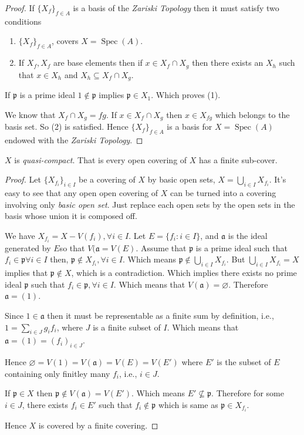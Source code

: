 \documentclass[]{report}
\DeclareMathOperator\Spec{Spec}
\begin{document}
\begin{proof}
    If $\{X_f\}_{f \in A}$ is a basis of the \textit{Zariski Topology} then it must satisfy two conditions
    \begin{enumerate}
        \item $\{X_f\}_{f \in A}$, covers $X = \Spec(A)$.
        \item If $X_f, X_f$ are base elements then if $x \in X_f \cap X_g$ then there exists an $X_h$ such that $x \in X_h$ and $X_h \subseteq X_f \cap X_g$.     \end{enumerate}

    If $\mathfrak{p}$ is a prime ideal $1 \not \in \mathfrak{p}$  implies $\mathfrak{p} \in X_1$. Which proves (1).

    We know that $X_f \cap X_g = fg$. If $x \in X_f \cap X_g$ then $x \in X_{fg}$ which belongs to the basis set. So (2) is satisfied. Hence $\{X_f\}_{f \in A}$ is a basis for $X = \Spec(A)$ endowed with the \textit{Zariski Topology}.

\end{proof}

$X$ is \textit{quasi-compact}. That is every open covering of $X$ has a finite sub-cover.
\begin{proof}
    Let $\{X_{f_i}\}_{i \in I}$ be a covering of $X$ by basic open sets, $X = \bigcup_{i \in I} X_{f_i}$. It's easy to see that any open open covering of $X$ can be turned into a covering involving only \textit{basic open set}. Just replace each open sets by the open sets in the basis whose union it is composed off. 

    We have $X_{f_i} = X - V(f_i), \forall i \in I$. Let $E = \{f_i : i \in I\}$, and $\mathfrak{a}$ is the ideal generated by $E$so that $V(\mathfrak{a} = V(E)$. Assume that $\mathfrak{p}$ is a prime ideal such that $f_i \in \mathfrak{p} \forall i \in I$ then, $\mathfrak{p} \not \in X_{f_i}, \forall i \in I$. Which means $\mathfrak{p} \not \in \bigcup_{i \in I} X_{f_i}$. But $\bigcup_{i \in I} X_{f_i} = X$ implies that $\mathfrak{p} \not \in X$, which is a contradiction. Which implies there exists no prime ideal $\mathfrak{p}$ such that $f_i \in \mathfrak{p}, \forall i \in I$. Which means that $V(\mathfrak{a}) = \varnothing$. Therefore $\mathfrak{a} = (1)$.

    Since $1 \in \mathfrak{a}$ then it must be representable as a finite sum  by definition, i.e., $1 = \sum_{i \in J} g_i f_i$, where $J$ is a finite subset of $I$. Which means that $\mathfrak{a} = (1) = (f_i)_{i \in J}$.
    
    Hence $\varnothing = V(1) = V(\mathfrak{a}) = V(E) = V(E')$ where $E'$ is the subset of $E$ containing only finitley many $f_i$, i.e., $i \in J$. 

    If $\mathfrak{p} \in X$ then $\mathfrak{p} \not \in V(\mathfrak{a}) = V(E')$. Which means $E' \not \subseteq \mathfrak{p}$. Therefore for some $i \in J$, there exists $f_i \in E'$ such that $f_i \not \in \mathfrak{p}$ which is same as $\mathfrak{p} \in X_{f_i}$.

    Hence $X$ is covered by a finite covering.
\end{proof}
\end{document}
